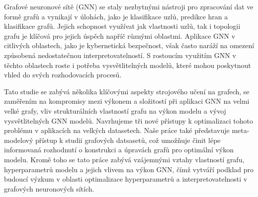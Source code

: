 \begin{abstract-czech}
	Grafové neuronové sítě (GNN) se staly nezbytnými nástroji pro zpracování dat ve formě grafů a vynikají v úlohách, jako je klasifikace uzlů, predikce hran a klasifikace grafů. Jejich schopnost využívat jak vlastnosti uzlů, tak i topologii grafu je klíčová pro jejich úspěch napříč různými oblastmi. Aplikace GNN v citlivých oblastech, jako je kybernetická bezpečnost, však často naráží na omezení způsobená nedostatečnou interpretovatelností. S rostoucím využitím GNN v těchto oblastech roste i potřeba vysvětlitelných modelů, které mohou poskytnout vhled do svých rozhodovacích procesů.

	Tato studie se zabývá několika klíčovými aspekty strojového učení na grafech, se zaměřením na kompromisy mezi výkonem a složitostí při aplikaci GNN na velmi velké grafy, vliv strukturálních vlastností grafu na výkon modelu a vývoj vysvětlitelných GNN modelů. Navrhujeme tři nové přístupy k optimalizaci tohoto problému v aplikacích na velkých datasetech. Naše práce také představuje meta-modelový přístup k studii grafových datsasetů, což umožňuje činit lépe informovaná rozhodnutí o konstrukci a úpravách grafů pro optimální výkon modelu. Kromě toho se tato práce zabývá vzájemnými vztahy vlastností grafu, hyperparametrů modelu a jejich vlivem na výkon GNN, čímž vytváří podklad pro budoucí výzkum v oblasti optimalizace hyperparametrů a interpretovatelnosti v grafových neuronových sítích.
\end{abstract-czech}
